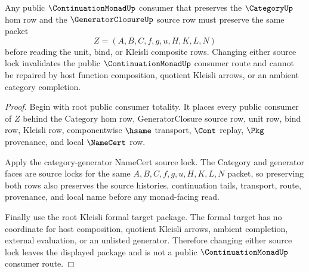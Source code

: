 \begin{theorem}
\label{thm:continuation-monad-root-public-source-lock}
Any public $\ContinuationMonadUp$ consumer that preserves the $\CategoryUp$ hom row and the $\GeneratorClosureUp$ source row must preserve the same packet
$$
Z=(A,B,C,f,g,u,H,K,L,N)
$$
before reading the unit, bind, or Kleisli composite rows. Changing either source lock invalidates the public $\ContinuationMonadUp$ consumer route and cannot be repaired by host function composition, quotient Kleisli arrows, or an ambient category completion.
\end{theorem}
\begin{proof}
Begin with root public consumer totality. It places every public consumer of $Z$ behind the Category hom row, GeneratorClosure source row, unit row, bind row, Kleisli row, componentwise $\hsame$ transport, $\Cont$ replay, $\Pkg$ provenance, and local $\NameCert$ row.

Apply the category-generator NameCert source lock. The Category and generator faces are source locks for the same $A,B,C,f,g,u,H,K,L,N$ packet, so preserving both rows also preserves the source histories, continuation tails, transport, route, provenance, and local name before any monad-facing read.

Finally use the root Kleisli formal target package. The formal target has no coordinate for host composition, quotient Kleisli arrows, ambient completion, external evaluation, or an unlisted generator. Therefore changing either source lock leaves the displayed package and is not a public $\ContinuationMonadUp$ consumer route.
\end{proof}

